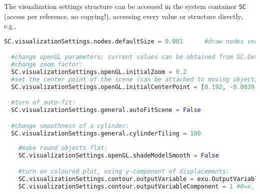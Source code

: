 The visualization settings structure can be accessed in the system container \texttt{SC} (access per reference, no copying!), accessing every value or structure directly, e.g.,
\pythonstyle
\begin{lstlisting}[language=Python, firstnumber=1]
  SC.visualizationSettings.nodes.defaultSize = 0.001      #draw nodes very small

  #change openGL parameters; current values can be obtained from SC.GetRenderState()
  #change zoom factor:
  SC.visualizationSettings.openGL.initialZoom = 0.2       
  #set the center point of the scene (can be attached to moving object):
  SC.visualizationSettings.openGL.initialCenterPoint = [0.192, -0.0039,-0.075]

  #turn of auto-fit:
  SC.visualizationSettings.general.autoFitScene = False

  #change smoothness of a cylinder:
  SC.visualizationSettings.general.cylinderTiling = 100
	
	#make round objects flat:
	SC.visualizationSettings.openGL.shadeModelSmooth = False

	#turn on coloured plot, using y-component of displacements:
	SC.visualizationSettings.contour.outputVariable = exu.OutputVariableType.Displacement
	SC.visualizationSettings.contour.outputVariableComponent = 1 #0=x, 1=y, 2=z
\end{lstlisting}

